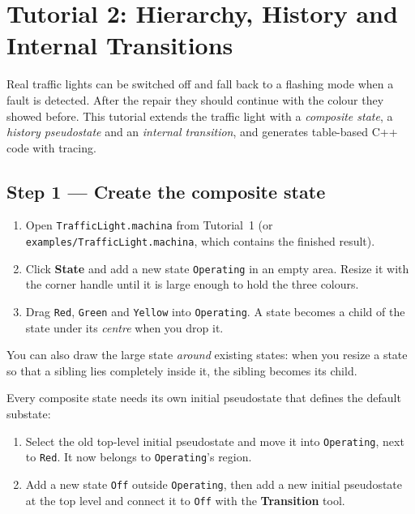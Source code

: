 \documentclass[11pt,a4paper,openany]{report}
\newcommand{\ui}[1]{\textsf{\textbf{#1}}}
\newcommand{\code}[1]{\texttt{#1}}
\begin{document}
\chapter{Tutorial 2: Hierarchy, History and Internal Transitions}
\label{ch:tut2}

Real traffic lights can be switched off and fall back to a flashing mode when a fault is detected.
After the repair they should continue with the colour they showed before. This tutorial extends the
traffic light with a \emph{composite state}, a \emph{history pseudostate} and an \emph{internal
transition}, and generates table-based C++ code with tracing.

\section{Step 1 --- Create the composite state}
\begin{enumerate}
  \item Open \code{TrafficLight.machina} from Tutorial~1 (or \code{examples/TrafficLight.machina},
        which contains the finished result).
  \item Click \ui{State} and add a new state \code{Operating} in an empty area. Resize it with the
        corner handle until it is large enough to hold the three colours.
  \item Drag \code{Red}, \code{Green} and \code{Yellow} into \code{Operating}. A state becomes a child of
        the state under its \emph{centre} when you drop it.
\end{enumerate}

\begin{tip}
You can also draw the large state \emph{around} existing states: when you resize a state so that a
sibling lies completely inside it, the sibling becomes its child.
\end{tip}

Every composite state needs its own initial pseudostate that defines the default substate:
\begin{enumerate}[resume]
  \item Select the old top-level initial pseudostate and move it into \code{Operating}, next to
        \code{Red}. It now belongs to \code{Operating}'s region.
  \item Add a new state \code{Off} outside \code{Operating}, then add a new initial pseudostate at the
        top level and connect it to \code{Off} with the \ui{Transition} tool.
\end{enumerate}
\end{document}
